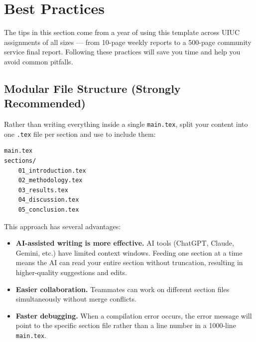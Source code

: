 
\section{Best Practices}

The tips in this section come from a year of using this template across
UIUC assignments of all sizes — from 10-page weekly reports to a 500-page
community service final report.
Following these practices will save you time and help you avoid common pitfalls.

\subsection{Modular File Structure (Strongly Recommended)}

Rather than writing everything inside a single \texttt{main.tex}, split your
content into one \texttt{.tex} file per section and use \verb|| to
include them:

\begin{verbatim}
main.tex
sections/
    01_introduction.tex
    02_methodology.tex
    03_results.tex
    04_discussion.tex
    05_conclusion.tex
\end{verbatim}

This approach has several advantages:

\begin{itemize}
    \item \textbf{AI-assisted writing is more effective.}
          AI tools (ChatGPT, Claude, Gemini, etc.) have limited context
          windows. Feeding one section at a time means the AI can read your
          entire section without truncation, resulting in higher-quality
          suggestions and edits.
    \item \textbf{Easier collaboration.} Teammates can work on different
          section files simultaneously without merge conflicts.
    \item \textbf{Faster debugging.} When a compilation error occurs, the
          error message will point to the specific section file rather than
          a line number in a 1000-line \texttt{main.tex}.
\end{itemize}

